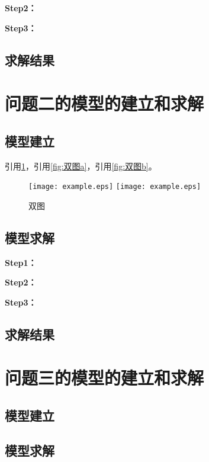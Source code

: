 \documentclass[withoutpreface,bwprint]{cumcmthesis}
\begin{document}
\textbf{Step2：} 

\textbf{Step3：} 

\subsection{求解结果}



\section{问题二的模型的建立和求解}
\subsection{模型建立}

引用\cref{fig:双图}，引用\cref{fig:双图a}，引用\cref{fig:双图b}。

\begin{figure}[ht]
\centering
{}
{\texttt{[image: example.eps]}}
{\texttt{[image: example.eps]}}
\caption{双图}\label{fig:双图}
\end{figure} 

\subsection{模型求解}

\textbf{Step1：} 

\textbf{Step2：} 

\textbf{Step3：} 

\subsection{求解结果}


\section{问题三的模型的建立和求解}
\subsection{模型建立}

\subsection{模型求解}
\end{document}
